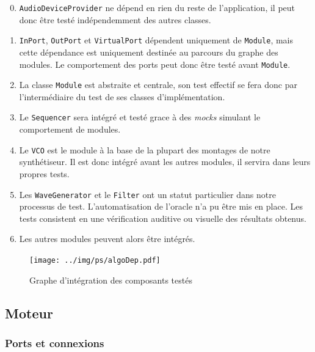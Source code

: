 \begin{enumerate}
    \setcounter{enumi}{-1}
    \item  \texttt{AudioDeviceProvider} ne dépend en rien du reste de l'application, il peut donc être testé indépendemment des autres classes.
    \item \texttt{InPort}, \texttt{OutPort} et \texttt{VirtualPort} dépendent uniquement de \texttt{Module}, mais cette dépendance est uniquement destinée au parcours du graphe des modules. Le comportement des ports peut donc être testé avant \texttt{Module}.
    \item La classe \texttt{Module} est abstraite et centrale, son test effectif se fera donc par l'intermédiaire du test de ses classes d'implémentation.
    \item Le \texttt{Sequencer} sera intégré et testé grace à des \textit{mocks} simulant le comportement de modules.
    \item Le \texttt{VCO} est le module à la base de la plupart des montages de notre synthétiseur. Il est donc intégré avant les autres modules, il servira dans leurs propres tests.
    \item Les \texttt{WaveGenerator} et le \texttt{Filter} ont un statut particulier dans notre processus de test. L'automatisation de l'oracle n'a pu être mis en place. Les tests consistent en une vérification auditive ou visuelle des résultats obtenus.
    \item Les autres modules peuvent alors être intégrés.
\end{enumerate}

\begin{figure}[ht]
\centering
\texttt{[image: ../img/ps/algoDep.pdf]}
\caption{Graphe d’intégration des composants testés}
\label{integration}
\end{figure}


\subsection{Moteur}

\subsubsection{Ports et connexions}

